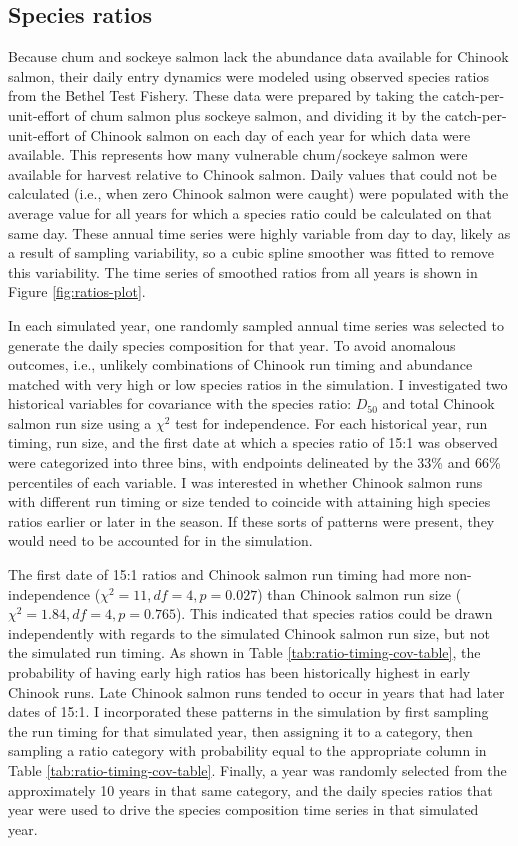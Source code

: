\documentclass[12pt,]{book}
\theoremstyle{definition}
\theoremstyle{definition}
\theoremstyle{definition}
\theoremstyle{remark}
\begin{document}
\subsection{Species ratios}\label{mse-data-ratios}

\noindent
Because chum and sockeye salmon lack the abundance data available for
Chinook salmon, their daily entry dynamics were modeled using observed
species ratios from the Bethel Test Fishery. These data were prepared by
taking the catch-per-unit-effort of chum salmon plus sockeye salmon, and
dividing it by the catch-per-unit-effort of Chinook salmon on each day
of each year for which data were available. This represents how many
vulnerable chum/sockeye salmon were available for harvest relative to
Chinook salmon. Daily values that could not be calculated (i.e., when
zero Chinook salmon were caught) were populated with the average value
for all years for which a species ratio could be calculated on that same
day. These annual time series were highly variable from day to day,
likely as a result of sampling variability, so a cubic spline smoother
was fitted to remove this variability. The time series of smoothed
ratios from all years is shown in Figure \ref{fig:ratios-plot}.

In each simulated year, one randomly sampled annual time series was
selected to generate the daily species composition for that year. To
avoid anomalous outcomes, i.e., unlikely combinations of Chinook run
timing and abundance matched with very high or low species ratios in the
simulation. I investigated two historical variables for covariance with
the species ratio: \(D_{50}\) and total Chinook salmon run size using a
\(\chi^2\) test for independence. For each historical year, run timing,
run size, and the first date at which a species ratio of 15:1 was
observed were categorized into three bins, with endpoints delineated by
the 33\% and 66\% percentiles of each variable. I was interested in
whether Chinook salmon runs with different run timing or size tended to
coincide with attaining high species ratios earlier or later in the
season. If these sorts of patterns were present, they would need to be
accounted for in the simulation.

The first date of 15:1 ratios and Chinook salmon run timing had more
non-independence (\(\chi^2 = 11, df = 4, p = 0.027\)) than Chinook
salmon run size (\(\chi^2 = 1.84, df = 4, p = 0.765\)). This indicated
that species ratios could be drawn independently with regards to the
simulated Chinook salmon run size, but not the simulated run timing. As
shown in Table \ref{tab:ratio-timing-cov-table}, the probability of
having early high ratios has been historically highest in early Chinook
runs. Late Chinook salmon runs tended to occur in years that had later
dates of 15:1. I incorporated these patterns in the simulation by first
sampling the run timing for that simulated year, then assigning it to a
category, then sampling a ratio category with probability equal to the
appropriate column in Table \ref{tab:ratio-timing-cov-table}. Finally, a
year was randomly selected from the approximately 10 years in that same
category, and the daily species ratios that year were used to drive the
species composition time series in that simulated year.
\end{document}

